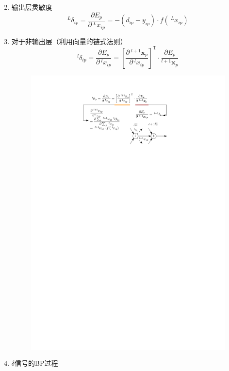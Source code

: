 \begin{note}
\begin{enumerate}
\[        \]
        \item 输出层灵敏度
        \[
            ^{L}\delta_{ip} = \dfrac{\partial E_{p}}{\partial\ ^{L}x_{ip}} = -\left( d_{ip}-y_{ip} \right)\cdot f(\ ^{L}x_{ip})
        \]
        \item 对于非输出层（利用向量的链式法则）
        \[
            ^{l}\delta_{ip} = \dfrac{\partial E_{p}}{\partial\ ^{l}x_{ip}} = \left[ \dfrac{\partial\ ^{l+1}\boldsymbol{x}_p}{\partial\ ^{l}x_{ip}} \right]^{\mathrm{T}}\cdot \dfrac{\partial E_{p}}{^{l+1}\boldsymbol{x}_p}
        \]
        \begin{figure}[htbp]
            \centering
            \includegraphics{image/BP的数学原理.pdf}
        \end{figure}
        \item $\delta$信号的BP过程
        \begin{figure}[htbp]
            \centering

\end{figure}
\end{enumerate}
\end{note}
